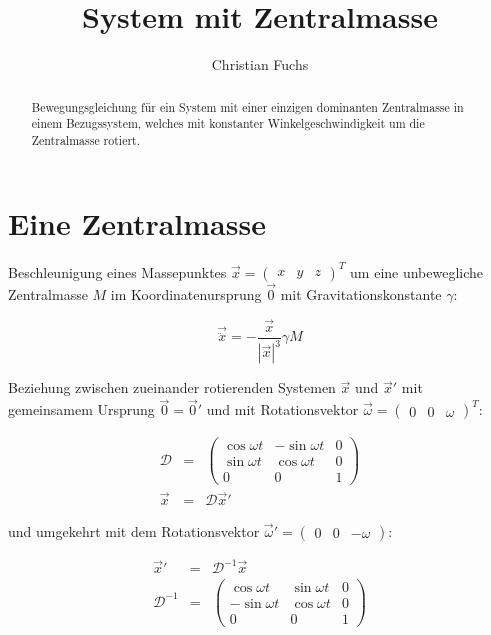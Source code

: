 \documentclass[12pt]{article}
\title{System mit Zentralmasse}
\author{Christian Fuchs}
\begin{document}
\maketitle

\begin{abstract}
Bewegungsgleichung für ein System mit einer einzigen dominanten Zentralmasse in einem Bezugssystem, welches mit konstanter Winkelgeschwindigkeit um die Zentralmasse rotiert.
\end{abstract}

\section{Eine Zentralmasse}

Beschleunigung eines Massepunktes $\vec{x} = \left( \begin{matrix} x & y & z \end{matrix} \right)^T$ um eine unbewegliche Zentralmasse $M$ im Koordinatenursprung $\vec{0}$ mit Gravitationskonstante $\gamma$:

\begin{equation}
\vec{\ddot{x}} = - \frac{\vec{x}}{\left| \vec{x} \right|^3} \gamma M \label{eq:basic}
\end{equation}

Beziehung zwischen zueinander rotierenden Systemen $\vec{x}$ und $\vec{x}'$ mit gemeinsamem Ursprung $\vec{0} = \vec{0}'$ und mit Rotationsvektor $\vec{\omega} = \left( \begin{matrix} 0 & 0 & \omega \end{matrix} \right)^T$:

\begin{eqnarray}
\mathcal{D} &=& \left(
\begin{matrix}
  \cos \omega t & -\sin \omega t & 0 \\
  \sin \omega t &  \cos \omega t & 0 \\
  0             &  0             & 1
\end{matrix}
\right) \nonumber \\
\vec{x}  &=& \mathcal{D} \vec{x}' \label{eq:xtoxprime}
\end{eqnarray}

\noindent und umgekehrt mit dem Rotationsvektor $\vec{\omega}' = \left( \begin{matrix} 0 & 0 & -\omega \end{matrix} \right)$:

\begin{eqnarray}
\vec{x}'  &=& \mathcal{D}^{-1} \vec{x} \nonumber \\
\mathcal{D}^{-1} &=& \left(
\begin{matrix}
  \cos \omega t &  \sin \omega t & 0 \\
 -\sin \omega t &  \cos \omega t & 0 \\
  0             &  0             & 1
\end{matrix}
\right) \nonumber
\end{eqnarray}
\end{document}
